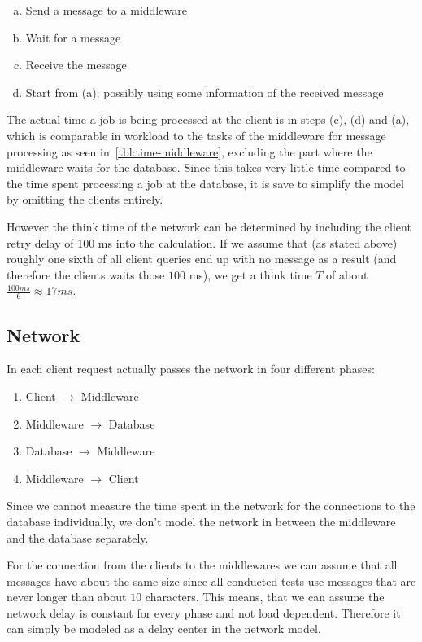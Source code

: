 \documentclass[a4paper, oneside]{csthesis}
\begin{document}
    \begin{enumerate}[(a)]
        \item Send a message to a middleware
        \item Wait for a message
        \item Receive the message
        \item Start from (a); possibly using some information of the received
        message
    \end{enumerate}

    The actual time a job is being processed at the client is in steps (c), (d)
    and (a), which is comparable in workload to the tasks of the middleware for
    message processing as seen in~\cref{tbl:time-middleware}, excluding the part
    where the middleware waits for the database. Since this takes very little time 
    compared to the time spent processing a job at the database, it is save to 
    simplify the model by omitting the clients entirely.
    
    However the think time of the network can be determined by including the
    client retry delay of $100$ ms into the calculation. If we assume that (as
    stated above) roughly one sixth of all client queries end up with no message
    as a result (and therefore the clients waits those $100$ ms), we get a think
    time $T$ of about $\frac{100ms}{6} \approx 17 ms$.

\subsection{Network}
    In \telesto each client request actually passes the network in four different 
    phases:

    \begin{enumerate}
        \item Client $\rightarrow$ Middleware
        \item Middleware $\rightarrow$ Database
        \item Database $\rightarrow$ Middleware
        \item Middleware $\rightarrow$ Client
    \end{enumerate}

    Since we cannot measure the time spent in the network for the connections to
    the database individually, we don't model the network in between the
    middleware and the database separately.

    For the connection from the clients to the middlewares we can assume that
    all messages have about the same size since all conducted tests use messages
    that are never longer than about $10$ characters. This means, that we can
    assume the network delay is constant for every phase and not load dependent.
    Therefore it can simply be modeled as a delay center in the network model.
\end{document}
